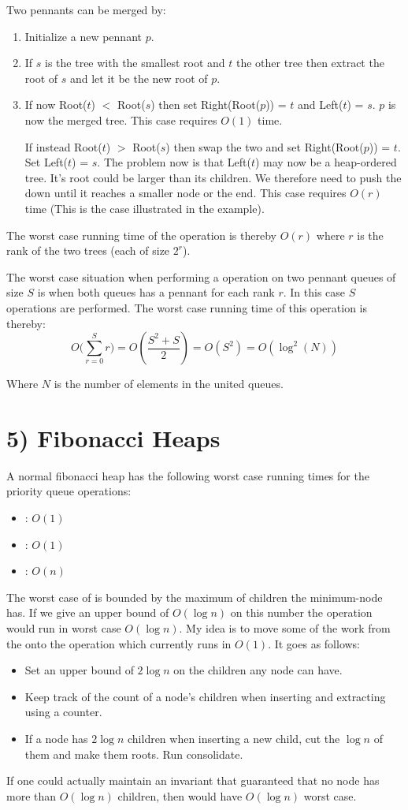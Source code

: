 \documentclass[10pt,oneside,a4paper,final,english]{memoir}
\begin{document}
\noindent
Two pennants can be merged by:
\begin{enumerate}
\item Initialize a new pennant $p$.
\item If $s$ is the tree with the smallest root and $t$ the other
  tree then extract the root of $s$ and let it be the new root of $p$.
\item If now Root($t$) $<$ Root($s$) then set
  Right(Root($p$)) = $t$ and Left($t$) = $s$. $p$ is now the merged
  tree. This case requires $O(1)$ time.

  If instead Root($t$) $>$ Root($s$) then swap the two and
  set Right(Root($p$)) = $t$. Set Left($t$) = $s$. The problem now is
  that Left($t$) may now be a heap-ordered tree. It's root could be
  larger than its children. We therefore need to push the down until
  it reaches a smaller node or the end. This case requires $O(r)$
  time (This is the case illustrated in the example).
\end{enumerate}

The worst case running time of the  operation is thereby
$O(r)$ where $r$ is the rank of the two trees (each of size $2^r$).

The worst case situation when performing a  operation on two
pennant queues of size $S$ is when both queues has a pennant for each
rank $r$. In this case $S$  operations are performed. The
worst case running time of this operation is thereby:
\[ O\Big(\sum_{r=0}^S r \Big) = O(\frac{S^2+S}{2}) = O(S^2) =
O(\log^2(N)) \]

Where $N$ is the number of elements in the united queues.


\section*{5) Fibonacci Heaps}
A normal fibonacci heap has the following worst case running times for
the priority queue operations:
\begin{itemize}
\item {}: $O(1)$
\item {}: $O(1)$
\item {}: $O(n)$
\end{itemize}

The worst case of  is bounded by the maximum of
children the minimum-node has. If we give an upper bound of $O(\log
n)$ on this number the operation would run in worst case $O(\log
n)$. My idea is to move some of the work from the 
onto the  operation which currently runs in $O(1)$. It goes
as follows:
\begin{itemize}
\item Set an upper bound of $2\log n$ on the children any node can
  have.
\item Keep track of the count of a node's children when inserting and
  extracting using a counter.
\item If a node has $2\log n$ children when inserting a new child, cut
  the $\log n$ of them and make them roots. Run consolidate.
\end{itemize}

If one could actually maintain an invariant that guaranteed that no
node has more than $O(\log n)$ children, then  would
have $O(\log n)$ worst case.
\end{document}
